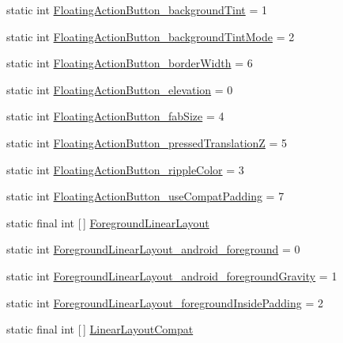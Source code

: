 \begin{DoxyCompactItemize}
\item 
static int \hyperlink{classandroid_1_1support_1_1design_1_1R_1_1styleable_af846797719110f77a09a57d36bf4e5e2}{Floating\+Action\+Button\+\_\+background\+Tint} = 1
\item 
static int \hyperlink{classandroid_1_1support_1_1design_1_1R_1_1styleable_a08b1b04544782c7a364e8aa475e6ad5e}{Floating\+Action\+Button\+\_\+background\+Tint\+Mode} = 2
\item 
static int \hyperlink{classandroid_1_1support_1_1design_1_1R_1_1styleable_a4263e98858725becbfec40a9015c85cc}{Floating\+Action\+Button\+\_\+border\+Width} = 6
\item 
static int \hyperlink{classandroid_1_1support_1_1design_1_1R_1_1styleable_a6872ef133a4b1a3dea84be25257bd7b1}{Floating\+Action\+Button\+\_\+elevation} = 0
\item 
static int \hyperlink{classandroid_1_1support_1_1design_1_1R_1_1styleable_ac636b36a3beebb7099949c4de633530e}{Floating\+Action\+Button\+\_\+fab\+Size} = 4
\item 
static int \hyperlink{classandroid_1_1support_1_1design_1_1R_1_1styleable_a74997a047886cf139621d06e7bdd2f06}{Floating\+Action\+Button\+\_\+pressed\+TranslationZ} = 5
\item 
static int \hyperlink{classandroid_1_1support_1_1design_1_1R_1_1styleable_aca2b9d9c2c8a2eab5ffeaa66dd6a13cb}{Floating\+Action\+Button\+\_\+ripple\+Color} = 3
\item 
static int \hyperlink{classandroid_1_1support_1_1design_1_1R_1_1styleable_a30d672b56fb17fedc1b2c1693a6c56c4}{Floating\+Action\+Button\+\_\+use\+Compat\+Padding} = 7
\item 
static final int \mbox{[}$\,$\mbox{]} \hyperlink{classandroid_1_1support_1_1design_1_1R_1_1styleable_a423286315758e65de84a49f81984f19a}{Foreground\+Linear\+Layout}
\item 
static int \hyperlink{classandroid_1_1support_1_1design_1_1R_1_1styleable_af95f0f9cddcead7a566b9ea5c9aea266}{Foreground\+Linear\+Layout\+\_\+android\+\_\+foreground} = 0
\item 
static int \hyperlink{classandroid_1_1support_1_1design_1_1R_1_1styleable_afb66c4e2a1db5b71fe6b3edcdcaa6af7}{Foreground\+Linear\+Layout\+\_\+android\+\_\+foreground\+Gravity} = 1
\item 
static int \hyperlink{classandroid_1_1support_1_1design_1_1R_1_1styleable_a6e8162828ab75d4722e3d9afee641609}{Foreground\+Linear\+Layout\+\_\+foreground\+Inside\+Padding} = 2
\item 
static final int \mbox{[}$\,$\mbox{]} \hyperlink{classandroid_1_1support_1_1design_1_1R_1_1styleable_a00b7e2da5bc1f659d80ac76716119713}{Linear\+Layout\+Compat}

\end{DoxyCompactItemize}
